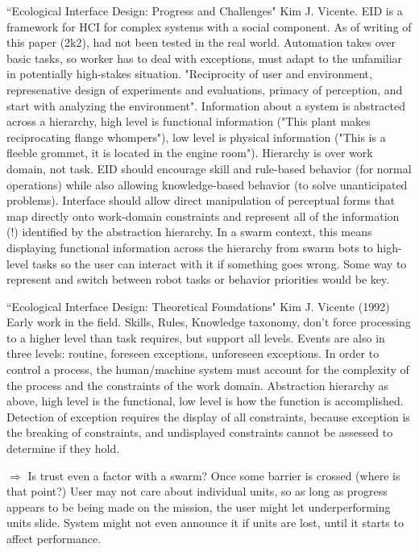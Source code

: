 \documentclass[]{article}
\begin{document}
``Ecological Interface Design: Progress and Challenges" \cite{vicente2002ecological} Kim J. Vicente. EID is a framework for HCI for complex systems with a social component. As of writing of this paper (2k2), had not been tested in the real world. Automation takes over basic tasks, so worker has to deal with exceptions, must adapt to the unfamiliar in potentially high-stakes situation. "Reciprocity of user and environment, represenative design of experiments and evaluations, primacy of perception, and start with analyzing the environment". Information about a system is abstracted across a hierarchy, high level is functional information ("This plant makes reciprocating flange whompers"), low level is physical information ("This is a fleeble grommet, it is located in the engine room"). Hierarchy is over work domain, not task. EID should encourage skill and rule-based behavior (for normal operations) while also allowing knowledge-based behavior (to solve unanticipated problems). Interface should allow direct manipulation of perceptual forms that map directly onto work-domain constraints and represent all of the information (!) identified by the abstraction hierarchy. In a swarm context, this means displaying functional information across the hierarchy from swarm bots to high-level tasks so the user can interact with it if something goes wrong. Some way to represent and switch between robot tasks or behavior priorities would be key. 

``Ecological Interface Design: Theoretical Foundations" \cite{vicente1992ecological} Kim J. Vicente (1992) Early work in the field. Skills, Rules, Knowledge taxonomy, don't force processing to a higher level than task requires, but support all levels. Events are also in three levels: routine, foreseen exceptions, unforeseen exceptions. In order to control a process, the human/machine system must account for the complexity of the process and the constraints of the work domain. Abstraction hierarchy as above, high level is the functional, low level is how the function is accomplished. Detection of exception requires the display of all constraints, because exception is the breaking of constraints, and undisplayed constraints cannot be assessed to determine if they hold. 

$\Rightarrow$ Is trust even a factor with a swarm? Once some barrier is crossed (where is that point?) User may not care about individual units, so as long as progress appears to be being made on the mission, the user might let underperforming units slide. System might not even announce it if units are lost, until it starts to affect performance.  
\end{document}
